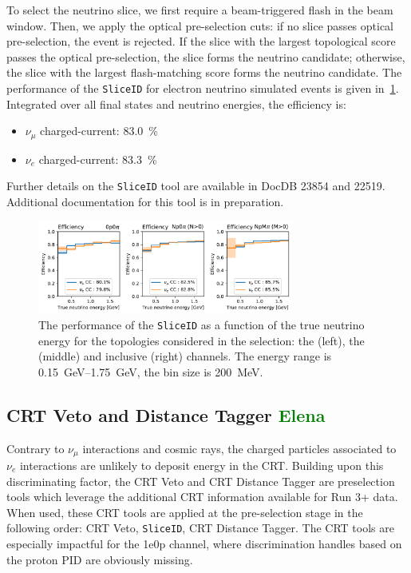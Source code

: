 To select the neutrino slice, we first require a beam-triggered flash in the beam window. 
Then, we apply the optical pre-selection cuts: if no slice passes optical pre-selection, the event is rejected. 
If the slice with the largest topological score passes the optical pre-selection, the slice forms the neutrino candidate; otherwise, the slice with the largest flash-matching score forms the neutrino candidate.
The performance of the \texttt{SliceID} for electron neutrino simulated events is given in~\cref{fig:sliceid}.
Integrated over all final states and neutrino energies, the efficiency is:
\begin{itemize}
    \item $\nu_\mu$ charged-current: \SI{83.0}{\%}
    \item $\nu_e$ charged-current: \SI{83.3}{\%}
\end{itemize}
Further details on the \texttt{SliceID} tool are available in DocDB 23854 and 22519. Additional documentation for this tool is in preparation.



\begin{figure}[H]
    \centering
    \includegraphics[width=0.75\textwidth]{NuId-Ch3/Images/sliceID.pdf}
    \caption{The performance of the \texttt{SliceID} as a function of the true neutrino energy for the topologies considered in the \nuecc selection: the \zpsel (left), the  \npsel (middle) and inclusive (right) channels. The energy range is \SIrange{0.15}{1.75}{\GeV}, the bin size is \SI{200}{\MeV}.}
    \label{fig:sliceid}
\end{figure}



\subsection{CRT Veto and Distance Tagger \textcolor{green}{Elena}}
\label{sec:sliceID:CRT}
Contrary to  $\nu_\mu$ interactions and cosmic rays, the charged particles associated to $\nu_e$ interactions are unlikely to deposit energy in the CRT. Building upon this discriminating factor, the CRT Veto and CRT Distance Tagger are preselection tools which leverage the additional CRT information available for Run 3+ data.
When used, these CRT tools are applied at the pre-selection stage in the following order: CRT Veto, \texttt{SliceID}, CRT Distance Tagger. The CRT tools are especially impactful for the 1e0p channel, where discrimination handles based on the proton PID are obviously missing. \\


